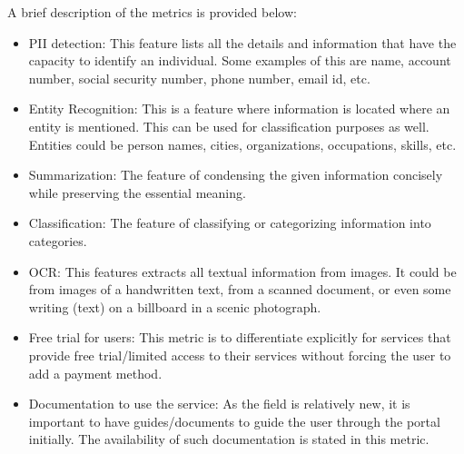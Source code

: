 A brief description of the metrics is provided below:
\begin{itemize}
    \item \acs{PII} detection: This feature lists all the details and information that have the capacity to identify an individual. Some examples of this are name, account number, social security number, phone number, email id, etc.
    \item Entity Recognition: This is a feature where information is located where an entity is mentioned. This can be used for classification purposes as well. Entities could be person names, cities, organizations, occupations, skills, etc.
    \item Summarization: The feature of condensing the given information concisely while preserving the essential meaning. 
    \item Classification: The feature of classifying or categorizing information into categories.
    \item \acs{OCR}: This features extracts all textual information from images. It could be from images of a handwritten text, from a scanned document, or even some writing (text) on a billboard in a scenic photograph.
    \item Free trial for users: This metric is to differentiate explicitly for services that provide free trial/limited access to their services without forcing the user to add a payment method.
    \item Documentation to use the service: As the field is relatively new, it is important to have guides/documents to guide the user through the portal initially. The availability of such documentation is stated in this metric.
\end{itemize}